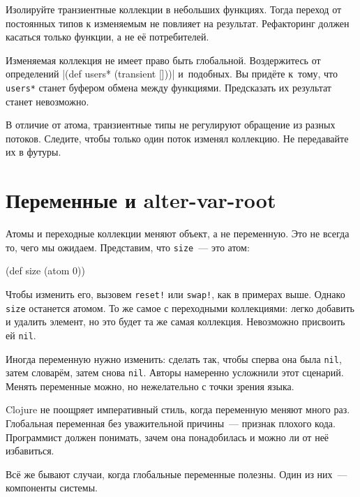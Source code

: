 Изолируйте транзиентные коллекции в небольших функциях. Тогда переход от
постоянных типов к изменяемым не повлияет на результат. Рефакторинг должен
касаться только функции, а не её потребителей.

Изменяемая коллекция не имеет право быть глобальной. Воздержитесь от определений
\spverb|(def users* (transient []))| и~подобных. Вы придёте к~тому, что
\verb|users*| станет буфером обмена между функциями. Предсказать их результат
станет невозможно.

В отличие от атома, транзиентные типы не регулируют обращение из разных
потоков. Следите, чтобы только один поток изменял коллекцию. Не передавайте их в
футуры.

\section{Переменные и alter-var-root}


\label{alter-var-root}

Атомы и переходные коллекции меняют объект, а не переменную. Это не всегда то,
чего мы ожидаем. Представим, что \verb|size|~--- это атом:

\begin{english}
  \begin{clojure}
(def size (atom 0))
  \end{clojure}
\end{english}

Чтобы изменить его, вызовем \verb|reset!| или \verb|swap!|, как в примерах
выше. Однако \verb|size| останется атомом. То же самое с переходными
коллекциями: легко добавить и удалить элемент, но это будет та же самая
коллекция. Невозможно присвоить ей \verb|nil|.

Иногда переменную нужно изменить: сделать так, чтобы сперва она была
\verb|nil|, затем словарём, затем снова \verb|nil|. Авторы намеренно
усложнили этот сценарий. Менять переменные можно, но нежелательно с точки зрения
языка.

Clojure не поощряет императивный стиль, когда переменную меняют много
раз. Глобальная переменная без уважительной причины~--- признак плохого кода.
Программист должен понимать, зачем она понадобилась и можно ли от неё
избавиться.


Всё же бывают случаи, когда глобальные переменные полезны. Один из них~---
компоненты системы.

